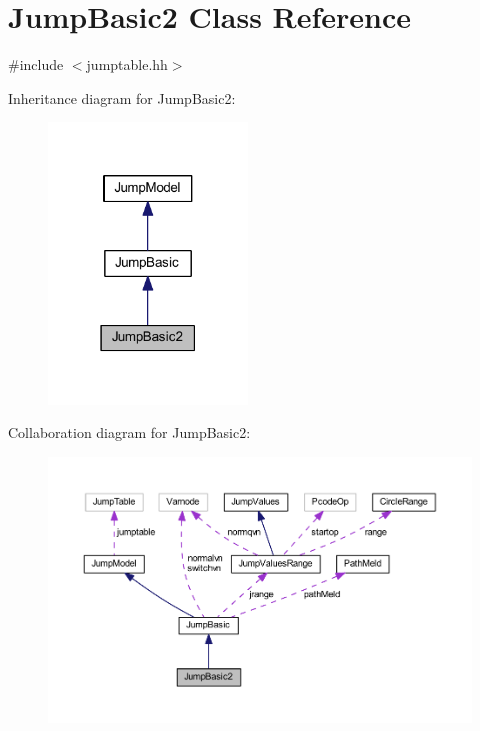 \hypertarget{class_jump_basic2}{}\section{Jump\+Basic2 Class Reference}
\label{class_jump_basic2}


{\ttfamily \#include $<$jumptable.\+hh$>$}



Inheritance diagram for Jump\+Basic2\+:
\nopagebreak
\begin{figure}[H]
\begin{center}
\leavevmode
\includegraphics[width=150pt]{class_jump_basic2__inherit__graph}
\end{center}
\end{figure}


Collaboration diagram for Jump\+Basic2\+:
\nopagebreak
\begin{figure}[H]
\begin{center}
\leavevmode
\includegraphics[width=350pt]{class_jump_basic2__coll__graph}
\end{center}
\end{figure}
